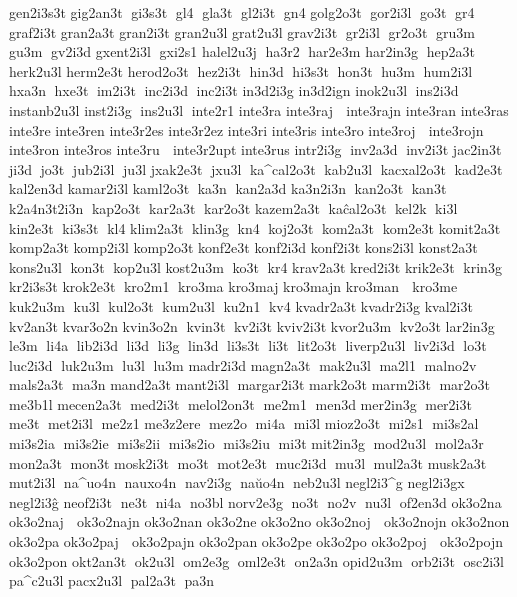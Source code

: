  gen2i3s3t 	 gig2an3t  gi3s3t  gl4  gla3t  gl2i3t  gn4 	 golg2o3t  gor2i3l  go3t  gr4 	 graf2i3t 	 gran2a3t 	 gran2i3t 	 gran2u3l 	 grat2u3l 	 grav2i3t  gr2i3l  gr2o3t  gru3m  gu3m  gv2i3d 
 gxent2i3l  gxi2s1 
 halel2u3j  ha3r2  har2e3m 	 har2in3g  hep2a3t 	 herk2u3l 	 herm2e3t 
 herod2o3t  hez2i3t  hin3d  hi3s3t  hon3t  hu3m  hum2i3l  hxa3n  hxe3t  im2i3t  inc2i3d  inc2i3t 	 in3d2i3g 	 in3d2ign 	 inok2u3l  ins2i3d  instanb2u3l 	 inst2i3g  ins2u3l  inte2r1 	 inte3ra  
 inte3raj   inte3rajn  
 inte3ran  
 inte3ras  	 inte3re  
 inte3ren  
 inte3r2es 
 inte3r2ez 	 inte3ri  
 inte3ris  	 inte3ro  
 inte3roj   inte3rojn  
 inte3ron  
 inte3ros  	 inte3ru   inte3r2upt 
 inte3rus  	 intr2i3g  inv2a3d  inv2i3t 	 jac2in3t  ji3d  jo3t  jub2i3l  ju3l 	 jxak2e3t  jxu3l  ka^cal2o3t  kab2u3l  kacxal2o3t  kad2e3t 	 kal2en3d 
 kamar2i3l 	 kaml2o3t  ka3n  kan2a3d 	 ka3n2i3n  kan2o3t  kan3t  k2a4n3t2i3n  kap2o3t  kar2a3t  kar2o3t 
 kazem2a3t  kaĉal2o3t  kel2k  ki3l  kin2e3t  ki3s3t  kl4 	 klim2a3t  klin3g  kn4  koj2o3t  kom2a3t  kom2e3t 
 komit2a3t 	 komp2a3t 	 komp2i3l 	 komp2o3t 	 konf2e3t 	 konf2i3d 	 konf2i3t 	 kons2i3l 
 konst2a3t 	 kons2u3l  kon3t  kop2u3l 	 kost2u3m  ko3t  kr4 	 krav2a3t 	 kred2i3t 	 krik2e3t  krin3g 	 kr2i3s3t 	 krok2e3t  kro2m1  kro3ma  	 kro3maj  
 kro3majn  	 kro3man   kro3me   kuk2u3m  ku3l  kul2o3t  kum2u3l  ku2n1  kv4 
 kvadr2a3t 
 kvadr2i3g 	 kval2i3t  kv2an3t 	 kvar3o2n 	 kvin3o2n  kvin3t  kv2i3t 	 kviv2i3t 	 kvor2u3m  kv2o3t 	 lar2in3g  le3m  li4a  lib2i3d  li3d  li3g  lin3d  li3s3t  li3t  lit2o3t  liverp2u3l  liv2i3d  lo3t  luc2i3d  luk2u3m  lu3l  lu3m 	 madr2i3d 	 magn2a3t  mak2u3l  ma2l1  malno2v 	 mals2a3t  ma3n 	 mand2a3t 	 mant2i3l  margar2i3t 	 mark2o3t 	 marm2i3t  mar2o3t  me3b1l 
 mecen2a3t  med2i3t  melol2on3t  me2m1  men3d 	 mer2in3g  mer2i3t  me3t  met2i3l  me2z1 	 me3z2ere  mez2o  mi4a  mi3l 	 mioz2o3t  mi2s1  mi3s2al  mi3s2ia  mi3s2ie  mi3s2ii  mi3s2io  mi3s2iu  mi3t 	 mit2in3g  mod2u3l  mol2a3r  mon2a3t  mon3t 	 mosk2i3t  mo3t  mot2e3t  muc2i3d  mu3l  mul2a3t 	 musk2a3t  mut2i3l  na^uo4n  nauxo4n  nav2i3g  naŭo4n  neb2u3l 
 negl2i3^g 
 negl2i3gx 
 negl2i3ĝ 	 neof2i3t  ne3t  ni4a  no3bl 	 norv2e3g  no3t  no2v  nu3l  of2en3d 	 ok3o2na  
 ok3o2naj   ok3o2najn  
 ok3o2nan  	 ok3o2ne  	 ok3o2no  
 ok3o2noj   ok3o2nojn  
 ok3o2non  	 ok3o2pa  
 ok3o2paj   ok3o2pajn  
 ok3o2pan  	 ok3o2pe  	 ok3o2po  
 ok3o2poj   ok3o2pojn  
 ok3o2pon  	 okt2an3t  ok2u3l  om2e3g  oml2e3t  on2a3n 	 opid2u3m  orb2i3t  osc2i3l 	 pa^c2u3l 	 pacx2u3l  pal2a3t  pa3n 

